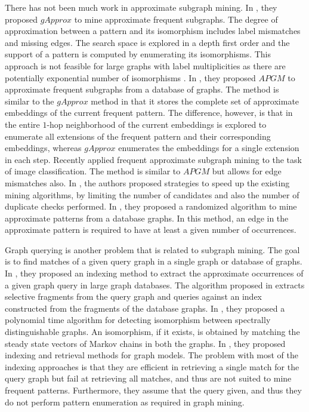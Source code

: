 There has not been much work in approximate subgraph
mining.  In \cite{gapprox}, they proposed $gApprox$ to mine approximate
frequent subgraphs.  The degree of approximation between a pattern and its
isomorphism includes label mismatches and missing edges. The search space
is explored in a depth first order and the support of a pattern is
computed by enumerating its isomorphisms. This approach is not feasible
for large graphs with label multiplicities as there are potentially
exponential number of isomorphisms \cite{2011-icdm}.
In \cite{JiaZH11}, they proposed $APGM$ to approximate frequent
subgraphs from a database of graphs. The method is similar to the
$gApprox$ method in that it stores the complete set of approximate
embeddings of the current frequent pattern. The difference, however, is
that in \cite{JiaZH11} the entire $1$-hop neighborhood of the current
embeddings is explored to enumerate all extensions of the frequent
pattern and their corresponding embeddings, whereas $gApprox$ enumerates
the embeddings for a single extension in each step.  Recently \cite{ImageFAS} applied
frequent approximate subgraph mining to the task of image
classification. The method is similar to $APGM$ but allows for edge
mismatches also. In \cite{SpeedUpFAS}, the authors proposed strategies
to speed up the existing mining algorithms, by
limiting the number of candidates and also the number of duplicate
checks performed.
In \cite{RAM2008}, they proposed a randomized algorithm to mine
approximate patterns from a database graphs. In this method, an edge in
the approximate pattern is required to have at least a given number of
occurrences. 

Graph querying is another problem that is related to
subgraph mining. The goal is to find matches of a given query graph in a
single graph or database of graphs.  In \cite{TALE}, they proposed an
indexing method to extract the approximate occurrences of a given graph
query in large graph databases.  The algorithm proposed in
\cite{yan.icde:2006} extracts selective fragments from the query graph
and queries against an index constructed from the fragments of the
database graphs. In \cite{RandomMatching}, they proposed a polynomial
time algorithm for detecting isomorphism between spectrally
distinguishable graphs. An isomorphism, if it exists, 
is obtained by matching
the steady state vectors of Markov chains in both the graphs.  In
\cite{BerettiIndexing}, they proposed indexing and retrieval methods for
graph models. The problem with most of the indexing approaches is that
they are efficient in retrieving a single match for the query graph but
fail at retrieving all matches, and thus are not suited to mine frequent
patterns. Furthermore, they assume that the query given, and thus they
do not perform pattern enumeration as required in graph mining.

